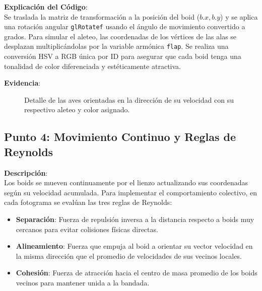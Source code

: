 \documentclass[11pt,a4paper]{article}
\begin{document}
\textbf{Explicación del Código}: \\
Se traslada la matriz de transformación a la posición del boid ($b.x, b.y$) y se aplica una rotación angular \lstinline{glRotatef} usando el ángulo de movimiento convertido a grados. Para simular el aleteo, las coordenadas de los vértices de las alas se desplazan multiplicándolas por la variable armónica \lstinline{flap}. Se realiza una conversión HSV a RGB única por ID para asegurar que cada boid tenga una tonalidad de color diferenciada y estéticamente atractiva.

\textbf{Evidencia}:
\begin{figure}[htbp]
    \centering
    \caption{Detalle de las aves orientadas en la dirección de su velocidad con su respectivo aleteo y color asignado.}
    \label{fig:evidencia_punto3}
\end{figure}

\newpage

\subsection{Punto 4: Movimiento Continuo y Reglas de Reynolds}
\textbf{Descripción}: \\
Los boids se mueven continuamente por el lienzo actualizando sus coordenadas según su velocidad acumulada. Para implementar el comportamiento colectivo, en cada fotograma se evalúan las tres reglas de Reynolds:
\begin{itemize}
    \item \textbf{Separación}: Fuerza de repulsión inversa a la distancia respecto a boids muy cercanos para evitar colisiones físicas directas.
    \item \textbf{Alineamiento}: Fuerza que empuja al boid a orientar su vector velocidad en la misma dirección que el promedio de velocidades de sus vecinos locales.
    \item \textbf{Cohesión}: Fuerza de atracción hacia el centro de masa promedio de los boids vecinos para mantener unida a la bandada.
\end{itemize}
\end{document}
